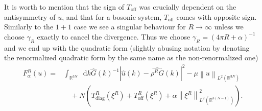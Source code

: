 \documentclass[a4paper,11pt]{article}
\newcommand{\norm}[1]{\left\lVert #1 \right\rVert}
\newcommand*\diff{\mathop{}\!\mathrm{d}}
\newcommand{\R}{\mathbb{R}}
\numberwithin{equation}{section}
\begin{document}
It is worth to mention that the sign of $ T_{\text{off}} $ was crucially dependent on the antisymmetry of $ u $, and that for a bosonic system, $ T_{\text{off}} $ comes with opposite sign. Similarly to the $ 1+1 $ case we see a singular behaviour for $ R\to\infty $ unless we choose $ \gamma_R $ exactly to cancel the divergence. Thus we choose $ \gamma_R=(4\pi R +\alpha)^{-1} $ and we end up with the quadratic form (slightly abusing notation by denoting the renormalized quadratic form by the same name as the non-renormalized one) \begin{equation}
\begin{aligned}
F_\alpha^R(u)=&\int_{\R^{3N}}\diff k \hat{G}(k)^{-1}|\hat{u}(k)-\widehat{\rho^R G}(k)|^2-\mu\norm{u}_{L^2(\R^{3N})}\\&\quad+N\left(T^R_{\text{diag}}(\xi^R)+T^R_{\text{off}}(\xi^R)+\alpha\norm{\xi^R}_{L^2(\R^{3(N-1)})}^2\right).
\end{aligned}
\end{equation}
\end{document}

